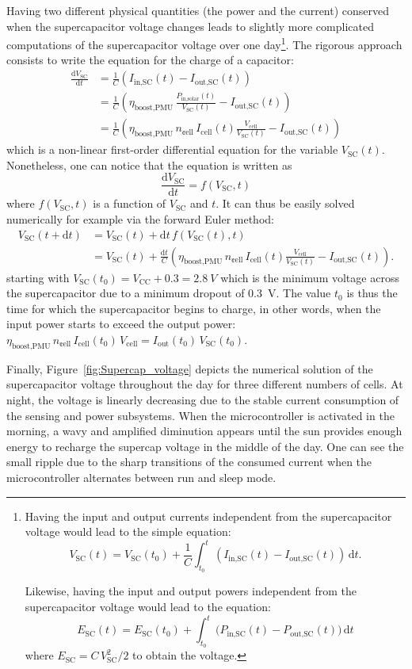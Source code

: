 \documentclass{EPL-master-thesis-covers-EN}
\newcommand{\te}[1]{\textrm{#1}}
\begin{document}
Having two different physical quantities (the power and the current) conserved when the supercapacitor voltage changes leads to slightly more complicated computations of the supercapacitor voltage over one day\footnote{Having the input and output currents independent from the supercapacitor voltage would lead to the simple equation: $$V_\te{SC}(t) = V_\te{SC}(t_0) + \frac{1}{C} \int_{t_0}^t (I_\te{in,SC}(t) - I_\te{out,SC}(t))\, \te{d}t.$$

Likewise, having the input and output powers independent from the supercapacitor voltage would lead to the equation: $$E_\te{SC}(t) = E_\te{SC}(t_0) + \int_{t_0}^t \big(P_\te{in,SC}(t) - P_\te{out,SC}(t)\big)\, \te{d}t$$ where $E_\te{SC} = C\, V_\te{SC}^2 / 2$ to obtain the voltage.}. The rigorous approach consists to write the equation for the charge of a capacitor:
\begin{align*}
 \frac{\te{d}V_\te{SC}}{\te{d}t} &= \frac{1}{C} \left( I_\te{in,SC}(t) - I_\te{out,SC}(t) \right) \\
 &= \frac{1}{C} \left( \eta_\te{boost,PMU} \, \frac{P_\te{in,solar}(t)}{V_\te{SC}(t)} - I_\te{out,SC}(t) \right) \\
 &= \frac{1}{C} \left( \eta_\te{boost,PMU} \, n_\te{¢ell} \, I_\te{cell}(t) \frac{V_\te{cell}}{V_\te{SC}(t)} - I_\te{out,SC}(t) \right)
\end{align*}
which is a non-linear first-order differential equation for the variable $V_\te{SC}(t)$. Nonetheless, one can notice that the equation is written as
\[
 \frac{\te{d}V_\te{SC}}{\te{d}t} = f(V_\te{SC}, t)
\]
where $f(V_\te{SC}, t)$ is a function of $V_\te{SC}$ and $t$. It can thus be easily solved numerically for example via the forward Euler method: 
\begin{align*}
 V_\te{SC}(t + \te{d}t) &= V_\te{SC}(t) + \te{d}t \, f(V_\te{SC}(t), t) \\
 &= V_\te{SC}(t) + \frac{\te{d}t}{C} \left( \eta_\te{boost,PMU} \, n_\te{¢ell} \, I_\te{cell}(t) \frac{V_\te{cell}}{V_\te{SC}(t)} - I_\te{out,SC}(t) \right).
\end{align*}
starting with $V_\te{SC}(t_0) = V_\te{CC} + 0.3 = \SI{2.8}{V}$ which is the minimum voltage across the supercapacitor due to a minimum dropout of \SI{0.3}{V}. The value $t_0$ is thus the time for which the supercapacitor begins to charge, in other words, when the input power starts to exceed the output power: $\eta_\te{boost,PMU} \, n_\te{¢ell} \, I_\te{cell}(t_0)\,V_\te{cell} = I_\te{out}(t_0) \, V_\te{SC}(t_0)$.

Finally, Figure~\ref{fig:Supercap_voltage} depicts the numerical solution of the supercapacitor voltage throughout the day for three different numbers of cells. At night, the voltage is linearly decreasing due to the stable current consumption of the sensing and power subsystems. When the microcontroller is activated in the morning, a wavy and amplified diminution appears until the sun provides enough energy to recharge the supercap voltage in the middle of the day. One can see the small ripple due to the sharp transitions of the consumed current when the microcontroller alternates between run and sleep mode.
\end{document}
